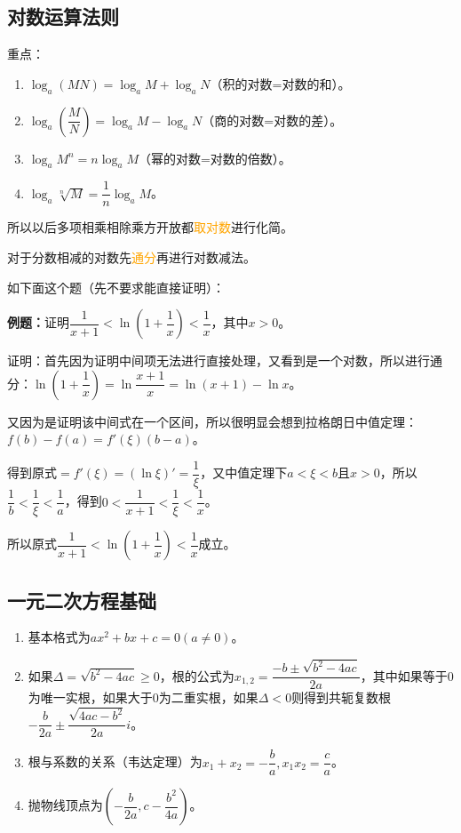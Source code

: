 \documentclass[UTF8, 12pt]{ctexart}
\begin{document}
\subsection{对数运算法则}

重点：

\begin{enumerate}
    \item $\log_a(MN)=\log_aM+\log_aN$（积的对数=对数的和）。
    \item $\log_a(\dfrac{M}{N})=\log_aM-\log_aN$（商的对数=对数的差）。
    \item $\log_aM^n=n\log_aM$（幂的对数=对数的倍数）。
    \item $\log_a\sqrt[n]{M}=\dfrac{1}{n}\log_aM$。
\end{enumerate}

所以以后多项相乘相除乘方开放都\textcolor{orange}{取对数}进行化简。

对于分数相减的对数先\textcolor{orange}{通分}再进行对数减法。

如下面这个题（先不要求能直接证明）：

\textbf{例题：}证明$\dfrac{1}{x+1}<\ln(1+\dfrac{1}{x})<\dfrac{1}{x}$，其中$x>0$。

证明：首先因为证明中间项无法进行直接处理，又看到是一个对数，所以进行通分：$\ln(1+\dfrac{1}{x})=\ln\dfrac{x+1}{x}=\ln(x+1)-\ln x$。

又因为是证明该中间式在一个区间，所以很明显会想到拉格朗日中值定理：$f(b)-f(a)=f'(\xi)(b-a)$。

得到原式$=f'(\xi)=(\ln\xi)'=\dfrac{1}{\xi}$，又中值定理下$a<\xi<b$且$x>0$，所以$\dfrac{1}{b}<\dfrac{1}{\xi}<\dfrac{1}{a}$，得到$0<\dfrac{1}{x+1}<\dfrac{1}{\xi}<\dfrac{1}{x}$。

所以原式$\dfrac{1}{x+1}<\ln(1+\dfrac{1}{x})<\dfrac{1}{x}$成立。

\subsection{一元二次方程基础}

\begin{enumerate}
    \item 基本格式为$ax^2+bx+c=0(a\neq 0)$。
    \item 如果$\Delta=\sqrt{b^2-4ac}\geqslant 0$，根的公式为$x_{1,2}=\dfrac{-b\pm\sqrt{b^2-4ac}}{2a}$，其中如果等于0为唯一实根，如果大于0为二重实根，如果$\Delta<0$则得到共轭复数根$-\dfrac{b}{2a}\pm\dfrac{\sqrt{4ac-b^2}}{2a}i$。
    \item 根与系数的关系（韦达定理）为$x_1+x_2=-\dfrac{b}{a},x_1x_2=\dfrac{c}{a}$。
    \item 抛物线顶点为$(-\dfrac{b}{2a},c-\dfrac{b^2}{4a})$。
\end{enumerate}
\end{document}

